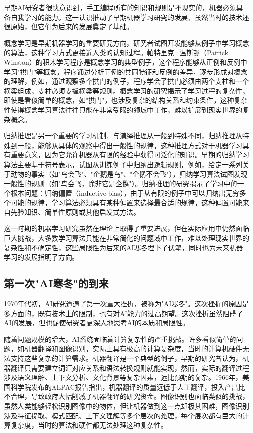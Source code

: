 早期AI研究者很快意识到，手工编程所有的知识和规则是不现实的，机器必须具备自我学习的能力。这一认识推动了早期机器学习研究的发展，虽然当时的技术还很原始，但它们为后来的发展奠定了基础。

概念学习是早期机器学习的重要研究方向，研究者试图开发能够从例子中学习概念的算法，这种学习方式更接近人类的认知过程。帕特里克·温斯顿（Patrick Winston）的积木学习程序是概念学习的典型例子，这个程序能够从正例和反例中学习"拱门"等概念，程序通过分析正例的共同特征和反例的差异，逐步形成对概念的理解，例如，通过观察多个拱门的例子，程序学会了拱门必须由两个支柱和一个横梁组成，支柱必须支撑横梁等规则。概念学习的研究揭示了学习过程的复杂性，即使是看似简单的概念，如"拱门"，也涉及复杂的结构关系和约束条件，这种复杂性使得概念学习算法往往只能在非常受限的领域中工作，难以扩展到现实世界的复杂概念。

归纳推理是另一个重要的学习机制，与演绎推理从一般到特殊不同，归纳推理从特殊到一般，能够从具体的观察中得出一般性的规律，这种推理方式对于机器学习具有重要意义，因为它允许机器从有限的经验中获得可泛化的知识。早期的归纳学习算法主要基于符号表示，试图从训练例子中归纳出逻辑规则，例如，给定一系列关于动物的事实（如"鸟会飞"、"企鹅是鸟"、"企鹅不会飞"），归纳学习算法试图发现一般性的规则（如"鸟会飞，除非它是企鹅"）。归纳推理的研究揭示了学习中的一个根本问题：归纳偏置（inductive bias），由于从有限的例子中可以归纳出无穷多个可能的规律，学习算法必须具有某种偏置来选择最合适的规律，这种偏置可能来自先验知识、简单性原则或其他启发式方法。

这一时期的机器学习研究虽然在理论上取得了重要进展，但在实际应用中仍然面临巨大挑战，大多数学习算法只能在非常简化的问题域中工作，难以处理现实世界的复杂性和不确定性，这些局限性为后来的AI寒冬埋下了伏笔，同时也为未来机器学习的发展指明了方向。

\subsection{第一次"AI寒冬"的到来}

1970年代初，AI研究遭遇了第一次重大挫折，被称为"AI寒冬"。这次挫折的原因是多方面的，既有技术上的限制，也有对AI能力的过高期望。这次挫折虽然阻碍了AI的发展，但也促使研究者更深入地思考AI的本质和局限性。

随着问题规模的增大，AI系统面临着计算复杂性的严重挑战。许多看似简单的问题，如机器翻译和图像识别，实际上具有极高的计算复杂度，当时的计算机硬件无法支持这些复杂的计算需求。机器翻译是一个典型的例子，早期的研究者认为，机器翻译只需要建立词汇对应关系和语法转换规则就能实现，然而，实际的翻译过程涉及语义理解、上下文分析、文化背景等复杂因素，远比预期的复杂。1966年，美国科学院发布的ALPAC报告指出，机器翻译的质量远低于人工翻译，投入产出比不合理，导致政府大幅削减了机器翻译的研究资金。图像识别也面临类似的挑战，虽然人类能够轻松识别图像中的物体，但让机器做到这一点却极其困难，图像识别涉及特征提取、模式匹配、上下文理解等多个层次的处理，每个层次都有巨大的计算复杂度，当时的算法和硬件都无法处理这种复杂性。

